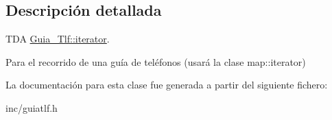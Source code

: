 \subsection{Descripción detallada}
T\+DA \hyperlink{classGuia__Tlf_1_1iterator}{Guia\+\_\+\+Tlf\+::iterator}. 

Para el recorrido de una guía de teléfonos (usará la clase map\+::iterator) 

La documentación para esta clase fue generada a partir del siguiente fichero\+:\begin{DoxyCompactItemize}
\item 
inc/guiatlf.\+h\end{DoxyCompactItemize}
